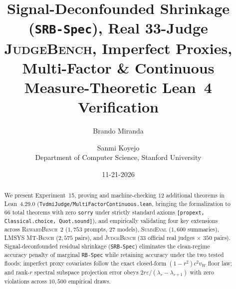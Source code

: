 \documentclass[11pt]{article}
\title{\textbf{Signal-Deconfounded Shrinkage (\texttt{SRB-Spec}), Real 33-Judge {\mdseries\scshape JudgeBench}, Imperfect Proxies, Multi-Factor \& Continuous Measure-Theoretic Lean~4 Verification}}
\author{Brando Miranda \quad\and\quad Sanmi Koyejo \\ Department of Computer Science, Stanford University}
\date{11-21-2026}
\begin{document}
\maketitle

\begin{abstract}
We present Experiment~15, proving and machine-checking $12$ additional theorems in Lean~4.29.0 (\texttt{TvdmiJudge/MultiFactorContinuous.lean}, bringing the formalization to $66$ total theorems with zero \texttt{sorry} under strictly standard axioms \texttt{[propext, Classical.choice, Quot.sound]}), and empirically validating four key extensions across \textsc{RewardBench~2} ($1,753$ prompts, $27$ models), \textsc{SummEval} ($1,600$ summaries), \textsc{LMSYS MT-Bench} ($2,575$ pairs), and \textsc{JudgeBench} ($33$ official real judges $\times$ $350$ pairs). Signal-deconfounded residual shrinkage (\texttt{SRB-Spec}) eliminates the clean-regime accuracy penalty of marginal \texttt{RB-Spec} while retaining accuracy under the two tested floods; imperfect proxy covariates follow the exact closed-form $(1-r^2)c^2 v_W$ floor law; and rank-$r$ spectral subspace projection error obeys $2r\varepsilon/(\lambda_r - \lambda_{r+1})$ with zero violations across $10{,}500$ empirical draws.
\end{abstract}
\end{document}
